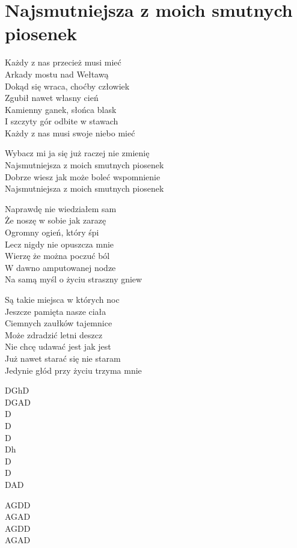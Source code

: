 \section{Najsmutniejsza z moich smutnych piosenek}
\begin{text}
\hfill\break
\hfill\break
Każdy z nas przecież musi mieć\\
Arkady mostu nad Wełtawą\\
Dokąd się wraca, choćby człowiek\\
Zgubił nawet własny cień\\
Kamienny ganek, słońca blask\\
I szczyty gór odbite w stawach\\
Każdy z nas musi swoje niebo mieć

\vin Wybacz mi ja się już raczej nie zmienię\\
\vin Najsmutniejsza z moich smutnych piosenek\\
\vin Dobrze wiesz jak może boleć wspomnienie\\
\vin Najsmutniejsza z moich smutnych piosenek

Naprawdę nie wiedziałem sam\\
Że noszę w sobie jak zarazę\\
Ogromny ogień, który śpi\\
Lecz nigdy nie opuszcza mnie\\
Wierzę że można poczuć ból\\
W dawno amputowanej nodze\\
Na samą myśl o życiu straszny gniew

Są takie miejsca w których noc\\
Jeszcze pamięta nasze ciała\\
Ciemnych zaułków tajemnice\\
Może zdradzić letni deszcz\\
Nie chcę udawać jest jak jest\\
Już nawet starać się nie staram\\
Jedynie głód przy życiu trzyma mnie
\end{text}
\begin{chord}
DGhD\\
DGAD\\
D\\
D\\
D\\
Dh\\
D\\
D\\
DAD

AGDD\\
AGAD\\
AGDD\\
AGAD
\end{chord}
